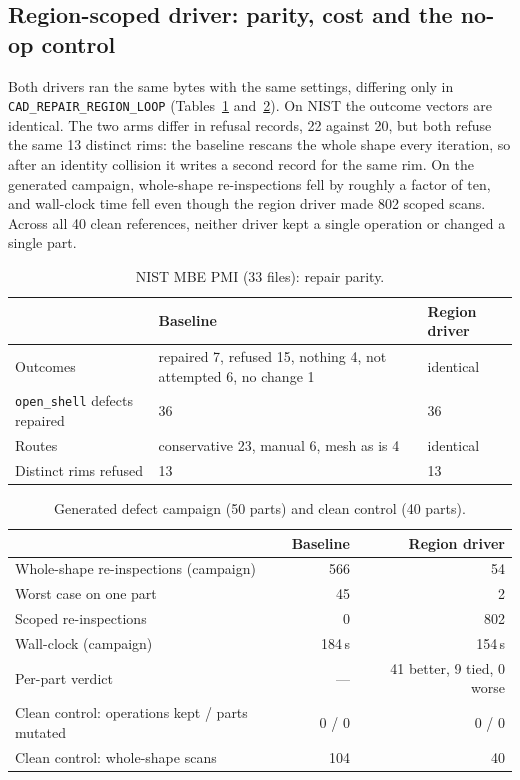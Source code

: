 \documentclass[11pt,onecolumn]{article}
\newcommand{\code}[1]{\texttt{\small #1}}
\begin{document}
\subsection{Region-scoped driver: parity, cost and the no-op control}\label{sec:parity}
Both drivers ran the same bytes with the same settings, differing only in
\code{CAD\_REPAIR\_REGION\_LOOP} (Tables~\ref{tab:nist} and~\ref{tab:cost}). On NIST the outcome
vectors are identical. The two arms differ in refusal records, 22 against 20, but both refuse the
same 13 distinct rims: the baseline rescans the whole shape every iteration, so after an identity
collision it writes a second record for the same rim. On the generated campaign, whole-shape
re-inspections fell by roughly a factor of ten, and wall-clock time fell even though the region
driver made 802 scoped scans. Across all 40 clean references, neither driver kept a single operation
or changed a single part.

\begin{table}[t]
\centering
\caption{NIST MBE PMI (33 files): repair parity.}
\label{tab:nist}
\small
\begin{tabularx}{\textwidth}{@{}l X l@{}}
\toprule
 & \textbf{Baseline} & \textbf{Region driver}\\
\midrule
Outcomes                           & repaired 7, refused 15, nothing 4, not attempted 6, no change 1 & identical\\
\code{open\_shell} defects repaired& 36                                      & 36\\
Routes                             & conservative 23, manual 6, mesh as is 4 & identical\\
Distinct rims refused              & 13                                      & 13\\
\bottomrule
\end{tabularx}
\end{table}

\begin{table}[t]
\centering
\caption{Generated defect campaign (50 parts) and clean control (40 parts).}
\label{tab:cost}
\small
\begin{tabularx}{\textwidth}{@{}X r r@{}}
\toprule
 & \textbf{Baseline} & \textbf{Region driver}\\
\midrule
Whole-shape re-inspections (campaign)          & 566    & 54\\
Worst case on one part                         & 45     & 2\\
Scoped re-inspections                          & 0      & 802\\
Wall-clock (campaign)                          & 184\,s & 154\,s\\
Per-part verdict                               & ---    & 41 better, 9 tied, 0 worse\\
Clean control: operations kept / parts mutated & 0 / 0  & 0 / 0\\
Clean control: whole-shape scans               & 104    & 40\\
\bottomrule
\end{tabularx}
\end{table}
\end{document}
